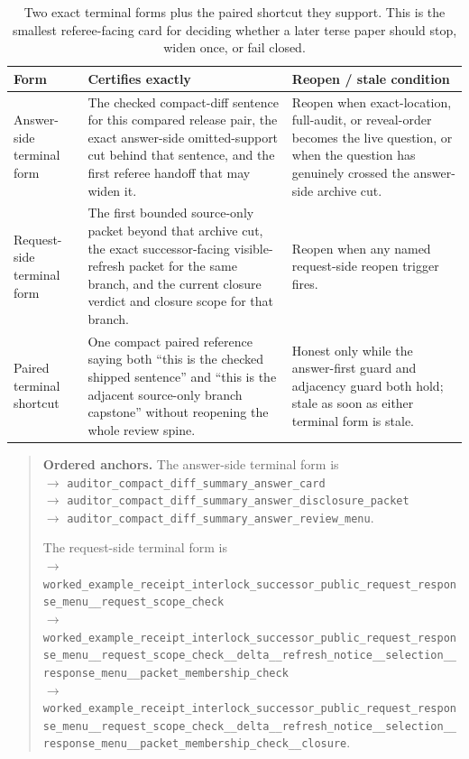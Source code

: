 \documentclass[11pt]{article}
\begin{document}
\begin{table}[t]
\centering
\small
\begin{tabularx}{\linewidth}{@{}l X X@{}}
\toprule
Form & Certifies exactly & Reopen / stale condition \\
\midrule
Answer-side terminal form & The checked compact-diff sentence for this compared release pair, the exact answer-side omitted-support cut behind that sentence, and the first referee handoff that may widen it. & Reopen when exact-location, full-audit, or reveal-order becomes the live question, or when the question has genuinely crossed the answer-side archive cut. \\
Request-side terminal form & The first bounded source-only packet beyond that archive cut, the exact successor-facing visible-refresh packet for the same branch, and the current closure verdict and closure scope for that branch. & Reopen when any named request-side reopen trigger fires. \\
Paired terminal shortcut & One compact paired reference saying both ``this is the checked shipped sentence'' and ``this is the adjacent source-only branch capstone'' without reopening the whole review spine. & Honest only while the answer-first guard and adjacency guard both hold; stale as soon as either terminal form is stale. \\
\bottomrule
\end{tabularx}
\caption{Two exact terminal forms plus the paired shortcut they support. This is the smallest referee-facing card for deciding whether a later terse paper should stop, widen once, or fail closed.}
\label{tab:workedexample-dual-terminal-card}
\end{table}

\begin{quote}\small
\textbf{Ordered anchors.}
The answer-side terminal form is
\\
$\to$ \texttt{auditor\_compact\_diff\_summary\_answer\_card}\\
$\to$ \texttt{auditor\_compact\_diff\_summary\_answer\_disclosure\_packet}\\
$\to$ \texttt{auditor\_compact\_diff\_summary\_answer\_review\_menu}.

\smallskip
\noindent The request-side terminal form is
\\
$\to$ \texttt{worked\_example\_receipt\_interlock\_successor\_public\_request\_response\_menu\_\_request\_scope\_check}\\
$\to$ \texttt{worked\_example\_receipt\_interlock\_successor\_public\_request\_response\_menu\_\_request\_scope\_check\_\_delta\_\_refresh\_notice\_\_selection\_\_response\_menu\_\_packet\_membership\_check}\\
$\to$ \texttt{worked\_example\_receipt\_interlock\_successor\_public\_request\_response\_menu\_\_request\_scope\_check\_\_delta\_\_refresh\_notice\_\_selection\_\_response\_menu\_\_packet\_membership\_check\_\_closure}.
\end{quote}
\end{document}
